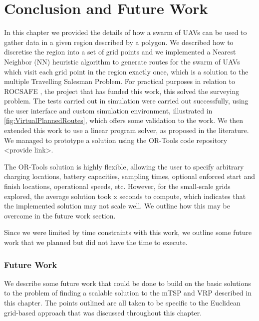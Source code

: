 \section{Conclusion and Future Work}
In this chapter we provided the details of how a swarm of UAVs can be used to gather data in a given region described by a polygon. We described how to discretise the region into a set of grid points and we implemented a Nearest Neighbor (NN) heuristic algorithm to generate routes for the swarm of UAVs which visit each grid point in the region exactly once, which is a solution to the multiple Travelling Salesman Problem. For practical purposes in relation to ROCSAFE \cite{rocsafeNUIG}, the project that has funded this work, this solved the surveying problem. The tests carried out in simulation were carried out successfully, using the user interface and custom simulation environment, illustrated in \ref{fig:VirtualPlannedRoutes}, which offers some validation to the work. We then extended this work to use a linear program solver, as proposed in the literature. We managed to prototype a solution using the OR-Tools code repository <provide link>.

The OR-Tools solution is highly flexible, allowing the user to specify arbitrary charging locations, battery capacities, sampling times, optional enforced start and finish locations, operational speeds, etc. However, for the small-scale grids explored, the average solution took x seconds to compute, which indicates that the implemented solution may not scale well. We outline how this may be overcome in the future work section.

Since we were limited by time constraints with this work, we outline some future work that we planned but did not have the time to execute.\par

\subsubsection{Future Work}
We describe some future work that could be done to build on the basic solutions to the problem of finding a scalable solution to the mTSP and VRP described in this chapter. The points outlined are all taken to be specific to the Euclidean grid-based approach that was discussed throughout this chapter.

